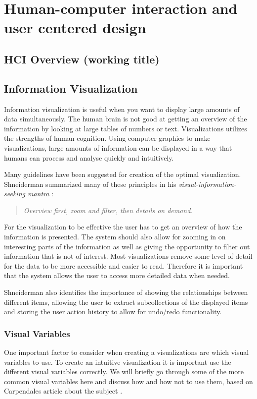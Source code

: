 \chapter{Human-computer interaction and user centered design}

\section{HCI Overview (working title)}

\section{Information Visualization}
Information visualization is useful when you want to display large amounts of data simultaneously. The human brain is not good at getting an overview of the information by looking at large tables of numbers or text. Visualizations utilizes the strengths of human cognition. Using computer graphics to make visualizations, large amounts of information can be displayed in a way that humans can process and analyse quickly and intuitively.

Many guidelines have been suggested for creation of the optimal visualization. Shneiderman summarized many of these principles in his \emph{visual-information-seeking mantra} \cite{shneiderman}:
\begin{quote}
\textit{Overview first, zoom and filter, then details on demand.}
\end{quote}

For the visualization to be effective the user has to get an overview of how the information is presented. The system should also allow for zooming in on interesting parts of the information as well as giving the opportunity to filter out information that is not of interest. Most visualizations remove some level of detail for the data to be more accessible and easier to read. Therefore it is important that the system allows the user to access more detailed data when needed.

Shneiderman also identifies the importance of showing the relationships between different items, allowing the user to extract subcollections of the displayed items and storing the user action history to allow for undo/redo functionality.

\subsection{Visual Variables}
One important factor to consider when creating a visualizations are which visual variables to use. To create an intuitive visualization it is important use the different visual variables correctly. We will briefly go through some of the more common visual variables here and discuss how and how not to use them, based on Carpendales article about the subject \cite{carpendale}.

